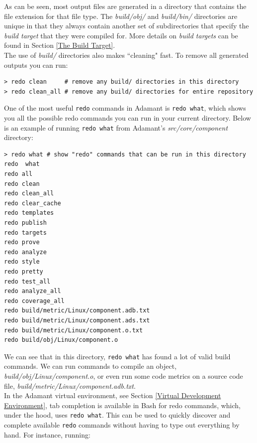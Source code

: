 As can be seen, most output files are generated in a directory that contains the file extension for that file type. The \textit{build/obj/} and \textit{build/bin/} directories are unique in that they always contain another set of subdirectories that specify the \textit{build target} that they were compiled for. More details on \textit{build targets} can be found in Section \ref{The Build Target}. \\

The use of \textit{build/} directories also makes ``cleaning" fast. To remove all generated outputs you can run:

\vspace{5mm} %
\begin{verbatim}
> redo clean     # remove any build/ directories in this directory
> redo clean_all # remove any build/ directories for entire repository
\end{verbatim}
\vspace{5mm} %

One of the most useful \texttt{redo} commands in Adamant is \texttt{redo what}, which shows you all the possible redo commands you can run in your current directory. Below is an example of running \texttt{redo what} from Adamant's \textit{src/core/component} directory:

\vspace{5mm} %
\begin{verbatim}
> redo what # show "redo" commands that can be run in this directory
redo  what
redo all
redo clean
redo clean_all
redo clear_cache
redo templates
redo publish
redo targets
redo prove
redo analyze
redo style
redo pretty
redo test_all
redo analyze_all
redo coverage_all
redo build/metric/Linux/component.adb.txt
redo build/metric/Linux/component.ads.txt
redo build/metric/Linux/component.o.txt
redo build/obj/Linux/component.o
\end{verbatim}
\vspace{5mm} %

We can see that in this directory, \texttt{redo what} has found a lot of valid build commands. We can run commands to compile an object, \textit{build/obj/Linux/component.o}, or even run some code metrics on a source code file, \textit{build/metric/Linux/component.adb.txt}. \\

In the Adamant virtual environment, see Section \ref{Virtual Development Environment}, tab completion is available in Bash for redo commands, which, under the hood, uses \texttt{redo what}. This can be used to quickly discover and complete available \texttt{redo} commands without having to type out everything by hand. For instance, running:


